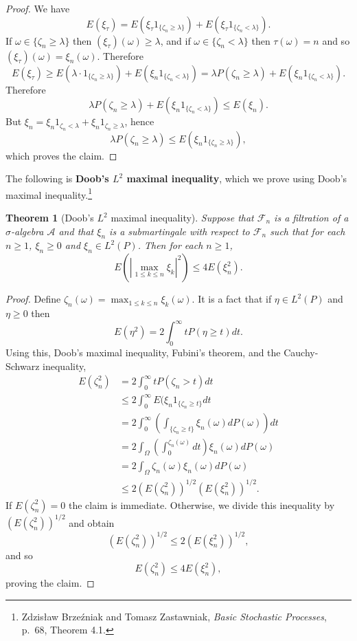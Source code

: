 \documentclass{article}
\newtheorem{theorem}{Theorem}
\theoremstyle{definition}
\begin{document}
\begin{proof}
We have
\[
E(\xi_\tau) = E(\xi_\tau 1_{\{\zeta_n \geq \lambda\}}) + E(\xi_\tau 1_{\{\zeta_n < \lambda\}}).
\]
If $\omega \in \{\zeta_n \geq \lambda\}$ then $(\xi_\tau)(\omega) \geq \lambda$, and if
$\omega \in  \{\zeta_n < \lambda\}$ then $\tau(\omega)=n$ and so $(\xi_\tau)(\omega)=\xi_n(\omega)$. Therefore
\[
E(\xi_\tau) \geq E(\lambda \cdot 1_{\{\zeta_n \geq \lambda\}}) + E(\xi_n 1_{\{\zeta_n < \lambda\}})
=\lambda P(\zeta_n \geq \lambda)+E(\xi_n 1_{\{\zeta_n < \lambda\}}).
\]
Therefore
\[
\lambda P(\zeta_n \geq \lambda)+E(\xi_n 1_{\{\zeta_n < \lambda\}}) \leq E(\xi_n).
\]
But $\xi_n = \xi_n 1_{\zeta_n < \lambda} + \xi_n 1_{\zeta_n \geq \lambda}$, hence
\[
\lambda P(\zeta_n \geq \lambda) \leq E(\xi_n 1_{\{\zeta_n \geq \lambda\}}),
\]
which proves the claim.
\end{proof}

The following is \textbf{Doob's  $L^2$ maximal  inequality}, which we prove using Doob's maximal inequality.\footnote{Zdzis\l{}aw Brze\'zniak and Tomasz Zastawniak, {\em Basic Stochastic Processes},
p.~68, Theorem 4.1.}

\begin{theorem}[Doob's $L^2$ maximal  inequality]
Suppose that $\mathscr{F}_n$ is a filtration of a $\sigma$-algebra $\mathscr{A}$ and that $\xi_n$ is a submartingale with
respect to $\mathscr{F}_n$ such that for each $n \geq 1$, $\xi_n \geq 0$ and $\xi_n \in L^2(P)$.
Then for each $n \geq 1$,
\[
E\left( \left| \max_{1 \leq k \leq n} \xi_k \right|^2 \right) \leq 4 E(\xi_n^2).
\]
\end{theorem}
\begin{proof}
Define $\zeta_n(\omega) = \max_{1 \leq k \leq n} \xi_k(\omega)$. 
It is a fact that if $\eta \in L^2(P)$ and $\eta \geq 0$ then
\[
E(\eta^2) = 2\int_0^\infty t P(\eta \geq  t) dt.
\]
Using this, Doob's maximal inequality, Fubini's theorem, and the Cauchy-Schwarz inequality, 
\begin{align*}
E(\zeta_n^2)&=2\int_0^\infty t P(\zeta_n > t) dt\\
&\leq 2\int_0^\infty E(\xi_n 1_{\{\zeta_n \geq t\}} dt\\
&=2 \int_0^\infty \left( \int_{\{\zeta_n \geq t\}} \xi_n(\omega) dP(\omega) \right) dt\\
&=2 \int_\Omega \left(\int_0^{\zeta_n(\omega)} dt \right) \xi_n(\omega) dP(\omega)\\
&=2\int_\Omega \zeta_n(\omega) \xi_n(\omega) dP(\omega)\\
&\leq 2 (E(\zeta_n^2))^{1/2} (E(\xi_n^2))^{1/2}.
\end{align*}
If $E(\zeta_n^2)=0$ the claim is immediate. Otherwise, we divide this inequality by $(E(\zeta_n^2))^{1/2}$ and obtain
\[
(E(\zeta_n^2))^{1/2} \leq 2 (E(\xi_n^2))^{1/2},
\]
and so
\[
E(\zeta_n^2) \leq 4 E(\xi_n^2),
\]
proving the claim.
\end{proof}
\end{document}
